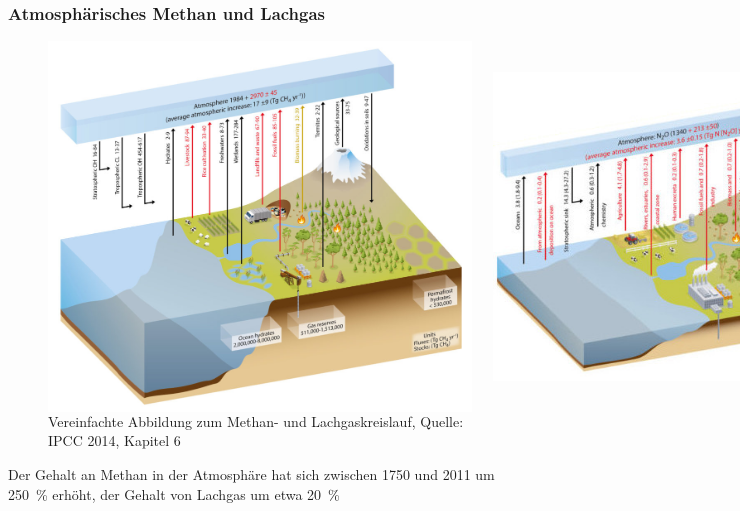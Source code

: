 \begin{frame}
	\frametitle{Atmosphärisches Methan und Lachgas}
	
	
	\begin{figure}
		\begin{columns}
				\includegraphics[width=\linewidth]{bilder/IPCC_Cycles_methane.jpg}
			
				\includegraphics[width=1.1\linewidth]{bilder/IPCC_Cycles_n2o_.jpg}
		\end{columns}
		\caption{Vereinfachte Abbildung zum Methan- und Lachgaskreislauf, Quelle: IPCC 2014, Kapitel 6}
	\end{figure}

	\vspace{-1cm}
	Der Gehalt an Methan in der Atmosphäre hat sich zwischen 1750 und 2011 um 250 \,\% erhöht, der Gehalt von Lachgas um etwa 20 \,\%

\end{frame}

